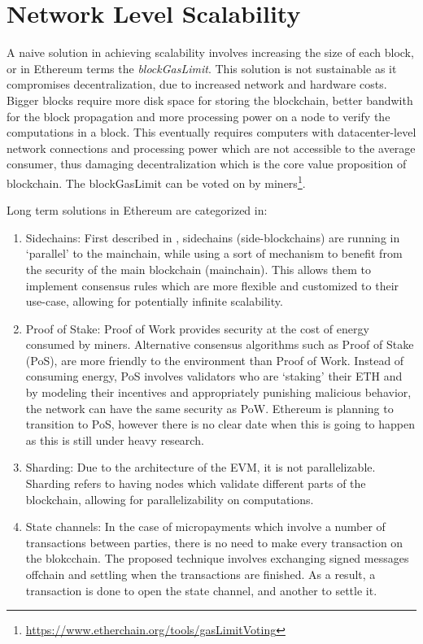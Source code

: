 \section{Network Level Scalability}
A naive solution in achieving scalability involves increasing the size of each block, or in Ethereum terms the \textit{blockGasLimit}. This solution is not sustainable as it compromises decentralization, due to increased network and hardware costs. Bigger blocks require more disk space for storing the blockchain, better bandwith for the block propagation and more processing power on a node to verify the computations in a block. This eventually requires computers with datacenter-level network connections and processing power which are not accessible to the average consumer, thus damaging decentralization which is the core value proposition of blockchain. The blockGasLimit can be voted on by miners\footnote{\url{https://www.etherchain.org/tools/gasLimitVoting}}. %

Long term solutions in Ethereum are categorized in:
\begin{enumerate}
    \item Sidechains: First described in \cite{sidechains}, sidechains (side-blockchains) are running in `parallel' to the mainchain, while using a sort of mechanism to benefit from the security of the main blockchain (mainchain). This allows them to implement consensus rules which are more flexible and customized to their use-case, allowing for potentially infinite scalability.
    \item Proof of Stake: Proof of Work provides security at the cost of energy consumed by miners. Alternative consensus algorithms such as Proof of Stake (PoS), are more friendly to the environment than Proof of Work\cite{powenv}. Instead of consuming energy, PoS involves validators who are `staking' their ETH and by modeling their incentives and appropriately punishing malicious behavior, the network can have the same security as PoW. Ethereum is planning to transition to PoS, however there is no clear date when this is going to happen as this is still under heavy research.
    \item Sharding: Due to the architecture of the EVM, it is not parallelizable. Sharding refers to having nodes which validate different parts of the blockchain, allowing for parallelizability on computations. 
    \item State channels: In the case of micropayments which involve a number of transactions between parties, there is no need to make every transaction on the blokcchain. The proposed technique involves exchanging signed messages offchain and settling when the transactions are finished. As a result, a transaction is done to open the state channel, and another to settle it.
\end{enumerate}
    
